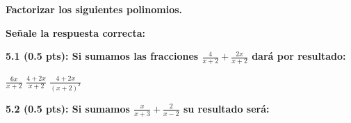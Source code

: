 \documentclass[11pt, addpoints, answers]{exam}
\begin{document}
\begin{questions}
		
		\question[1] \textbf{Factorizar los siguientes polinomios.}  
		
		\question[1] \textbf{Señale la respuesta correcta:}
		
		\textbf{5.1 (0.5 pts): Si sumamos las fracciones $\frac{4}{x+2} + \frac{2x}{x+2}$ dará por resultado:}
		
		\begin{choices} %
			\choice $\frac{6x}{x+2}$
			\choice $\frac{4+2x}{x+2}$
			\choice $\frac{4+2x}{(x+2)^2}$
		\end{choices}
		
		\vspace{1cm}
		
		\textbf{5.2 (0.5 pts): Si sumamos $\frac{x}{x+3} + \frac{2}{x-2}$ su resultado será:}
	

\end{questions}
\end{document}
